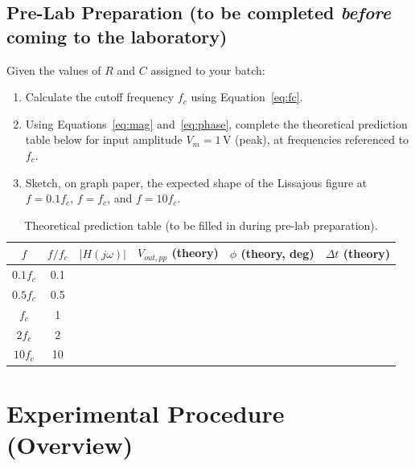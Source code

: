\subsection*{Pre-Lab Preparation (to be completed \emph{before} coming to the laboratory)}

Given the values of $R$ and $C$ assigned to your batch:

\begin{enumerate}[label=(\alph*)]
	\item Calculate the cutoff frequency $f_c$ using Equation~\eqref{eq:fc}.
	\item Using Equations~\eqref{eq:mag} and~\eqref{eq:phase}, complete the theoretical prediction table below for input amplitude $V_m = 1\,\text{V}$ (peak), at frequencies referenced to $f_c$.
	\item Sketch, on graph paper, the expected shape of the Lissajous figure at $f = 0.1f_c$, $f = f_c$, and $f = 10f_c$.
\end{enumerate}

\begin{table}[h!]
	\centering
	\begin{tabular}{@{}cccccc@{}}
		\toprule
		$f$ & $f/f_c$ & $|H(j\omega)|$ & $V_{out,pp}$ (theory) & $\phi$ (theory, deg) & $\Delta t$ (theory) \\
		\midrule
		$0.1 f_c$   & 0.1 &  &  &  &  \\
		$0.5 f_c$   & 0.5 &  &  &  &  \\
		$f_c$       & 1   &  &  &  &  \\
		$2 f_c$     & 2   &  &  &  &  \\
		$10 f_c$    & 10  &  &  &  &  \\
		\bottomrule
	\end{tabular}
	\caption{Theoretical prediction table (to be filled in during pre-lab preparation).}
	\label{tab:theory}
\end{table}

\section*{Experimental Procedure (Overview)}

